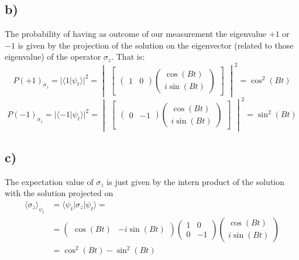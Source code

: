 \documentclass{article}
\begin{document}
\subsection*{b)}
The probability of having as outcome of our measurement the eigenvalue $+1$ or $-1$ is given by the projection of the solution on the eigenvector (related to those eigenvalue) of the operator $\sigma_z$. That is:
\[
    P(+1)_{\sigma_z} = |\langle 1| \psi_t\rangle|^2 =
    \begin{vmatrix}
    \begin{bmatrix}
        \begin{pmatrix}
            1 & 0
        \end{pmatrix}
        \begin{pmatrix}
            \cos{(Bt)}\\
            i\sin{(Bt)}
        \end{pmatrix}
    \end{bmatrix}
    \end{vmatrix}^2 
    = \cos^2{(Bt)}
\]
\[
    P(-1)_{\sigma_z} = |\langle -1| \psi_t\rangle|^2 =
    \begin{vmatrix}
    \begin{bmatrix}
        \begin{pmatrix}
            0 & -1
        \end{pmatrix}
        \begin{pmatrix}
            \cos{(Bt)}\\
            i\sin{(Bt)}
        \end{pmatrix}
    \end{bmatrix}
    \end{vmatrix}^2 
    = \sin^2{(Bt)}
\]
\subsection*{c)}
The expectation value of $\sigma_z$ is just given by the intern product of the solution with the solution projected on 
\[
    \begin{split}
        \langle \sigma_z \rangle_{\psi_t} &= \langle \psi_t | \sigma_z | \psi_t \rangle =\\
        &= \begin{pmatrix}
            \cos{(Bt)} & -i \sin{(Bt)}
        \end{pmatrix}
        \begin{pmatrix}
            1 & 0\\
            0 & -1
        \end{pmatrix}
        \begin{pmatrix}
            \cos{(Bt)}\\ 
            i \sin{(Bt)}
        \end{pmatrix}\\
        &= \cos^2{(Bt)} - \sin^2{(Bt)}
    \end{split}
\]
\end{document}
